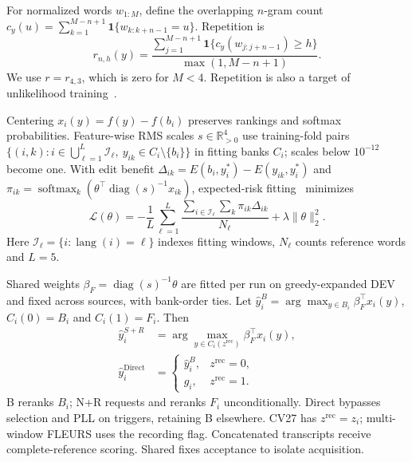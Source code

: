 \documentclass[conference,letterpaper]{IEEEtran}
\begin{document}
For normalized words $w_{1:M}$, define the overlapping $n$-gram count $c_y(u)=\sum_{k=1}^{M-n+1}\mathbf1\{w_{k:k+n-1}=u\}$. Repetition is
\begin{equation}
r_{n,h}(y)=\frac{\sum_{j=1}^{M-n+1}\mathbf1\{c_y(w_{j:j+n-1})\ge h\}}{\max(1,M-n+1)}.
\label{eq:repetition}
\end{equation}
We use $r=r_{4,3}$, which is zero for $M<4$. Repetition is also a target of unlikelihood training~\cite{welleck2020}.

Centering $x_i(y)=f(y)-f(b_i)$ preserves rankings and softmax probabilities. Feature-wise RMS scales $s\in\mathbb R^4_{>0}$ use training-fold pairs $\{(i,k):i\in\bigcup_{\ell=1}^L\mathcal I_\ell,\ y_{ik}\in C_i\setminus\{b_i\}\}$ in fitting banks $C_i$; scales below $10^{-12}$ become one. With edit benefit $\Delta_{ik}=E(b_i,y_i^*)-E(y_{ik},y_i^*)$ and $\pi_{ik}=\operatorname{softmax}_k\!\left(\theta^\top\operatorname{diag}(s)^{-1}x_{ik}\right)$, expected-risk fitting~\cite{mwer2018} minimizes
\begin{equation}
\mathcal L(\theta)=-\frac1L\sum_{\ell=1}^L\frac{\sum_{i\in\mathcal I_\ell}\sum_k\pi_{ik}\Delta_{ik}}{N_\ell}+\lambda\|\theta\|_2^2.
\label{eq:risk}
\end{equation}
Here $\mathcal I_\ell=\{i:\operatorname{lang}(i)=\ell\}$ indexes fitting windows, $N_\ell$ counts reference words and $L=5$.
\par
Shared weights $\beta_F=\operatorname{diag}(s)^{-1}\theta$ are fitted per run on greedy-expanded DEV and fixed across sources, with bank-order ties. Let $\hat{y}_i^B=\arg\max_{y\in B_i}\beta_F^\top x_i(y)$, $C_i(0)=B_i$ and $C_i(1)=F_i$. Then
\begin{equation}
\begin{aligned}
\hat{y}_i^{S+R}&=\arg\max_{y\in C_i(z^{\mathrm{rec}})}\beta_F^\top x_i(y),\\
\hat{y}_i^{\mathrm{Direct}}&=\begin{cases}\hat{y}_i^B,&z^{\mathrm{rec}}=0,\\g_i,&z^{\mathrm{rec}}=1.\end{cases}
\end{aligned}\label{eq:accept}
\end{equation}
B reranks $B_i$; N+R requests and reranks $F_i$ unconditionally. Direct bypasses selection and PLL on triggers, retaining B elsewhere. CV27 has $z^{\mathrm{rec}}=z_i$; multi-window FLEURS uses the recording flag. Concatenated transcripts receive complete-reference scoring. Shared fixes acceptance to isolate acquisition.
\end{document}
